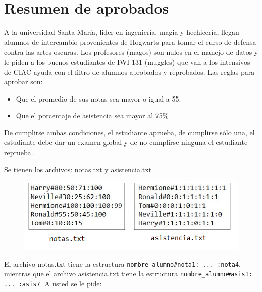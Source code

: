 \section{Resumen de aprobados}
A la universidad Santa María, lider en ingeniería, magia y hechicería, llegan alumnos de intercambio provenientes de Hogwarts para tomar el curso de defensa contra las artes oscuras. Los profesores (magos) son nulos en el manejo de datos y le piden a los buenos estudiantes de IWI-131 (muggles) que van a los intensivos de CIAC ayuda con el filtro de alumnos aprobados y reprobados. Las reglas para aprobar son:
\begin{itemize}
    \item Que el promedio de sus notas sea mayor o igual a 55.
    \item Que el porcentaje de asistencia sea mayor al 75\%
\end{itemize}

De cumplirse ambas condiciones, el estudiante aprueba, de cumplirse sólo una, el estudiante debe dar un examen global y de no cumplirse ninguna el estudiante reprueba.

Se tienen los archivos: notas.txt y asistencia.txt

\begin{figure}[h]
    \centering
    \includegraphics[scale=0.9]{Imagenes/archivos1.jpg}
\end{figure}

El archivo notas.txt tiene la estructura \texttt{nombre\_alumno\#nota1: ... :nota4}, mientras que el archivo asistencia.txt tiene la estructura \texttt{nombre\_alumno\#asis1: ... :asis7}. A usted se le pide:

